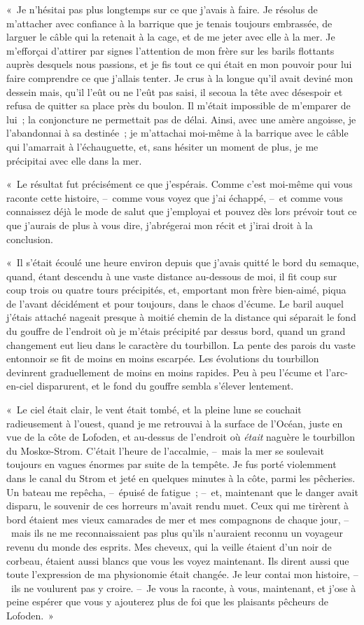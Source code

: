 \documentclass[french,twoside]{book} %
\begin{document}
« Je n’hésitai pas plus longtemps sur ce que j’avais à faire. Je résolus de m’attacher avec confiance à la barrique que je tenais toujours embrassée, de larguer le câble qui la retenait à la cage, et de me jeter avec elle à la mer. Je m’efforçai d’attirer par signes l’attention de mon frère sur les barils flottants auprès desquels nous passions, et je fis tout ce qui était en mon pouvoir pour lui faire comprendre ce que j’allais tenter. Je crus à la longue qu’il avait deviné mon dessein mais, qu’il l’eût ou ne l’eût pas saisi, il secoua la tête avec désespoir et refusa de quitter sa place près du boulon. Il m’était impossible de m’emparer de lui ; la conjoncture ne permettait pas de délai. Ainsi, avec une amère angoisse, je l’abandonnai à sa destinée ; je m’attachai moi-même à la barrique avec le câble qui l’amarrait à l’échauguette, et, sans hésiter un moment de plus, je me précipitai avec elle dans la mer.\par
« Le résultat fut précisément ce que j’espérais. Comme c’est moi-même qui vous raconte cette histoire, – comme vous voyez que j’ai échappé, – et comme vous connaissez déjà le mode de salut que j’employai et pouvez dès lors prévoir tout ce que j’aurais de plus à vous dire, j’abrégerai mon récit et j’irai droit à la conclusion.\par
« Il s’était écoulé une heure environ depuis que j’avais quitté le bord du semaque, quand, étant descendu à une vaste distance au-dessous de moi, il fit coup sur coup trois ou quatre tours précipités, et, emportant mon frère bien-aimé, piqua de l’avant décidément et pour toujours, dans le chaos d’écume. Le baril auquel j’étais attaché nageait presque à moitié chemin de la distance qui séparait le fond du gouffre de l’endroit où je m’étais précipité par dessus bord, quand un grand changement eut lieu dans le caractère du tourbillon. La pente des parois du vaste entonnoir se fit de moins en moins escarpée. Les évolutions du tourbillon devinrent graduellement de moins en moins rapides. Peu à peu l’écume et l’arc-en-ciel disparurent, et le fond du gouffre sembla s’élever lentement.\par
« Le ciel était clair, le vent était tombé, et la pleine lune se couchait radieusement à l’ouest, quand je me retrouvai à la surface de l’Océan, juste en vue de la côte de Lofoden, et au-dessus de l’endroit où \emph{était} naguère le tourbillon du Moskœ-Strom. C’était l’heure de l’accalmie, – mais la mer se soulevait toujours en vagues énormes par suite de la tempête. Je fus porté violemment dans le canal du Strom et jeté en quelques minutes à la côte, parmi les pêcheries. Un bateau me repêcha, – épuisé de fatigue ; – et, maintenant que le danger avait disparu, le souvenir de ces horreurs m’avait rendu muet. Ceux qui me tirèrent à bord étaient mes vieux camarades de mer et mes compagnons de chaque jour, – mais ils ne me reconnaissaient pas plus qu’ils n’auraient reconnu un voyageur revenu du monde des esprits. Mes cheveux, qui la veille étaient d’un noir de corbeau, étaient aussi blancs que vous les voyez maintenant. Ils dirent aussi que toute l’expression de ma physionomie était changée. Je leur contai mon histoire, – ils ne voulurent pas y croire. – Je vous la raconte, à vous, maintenant, et j’ose à peine espérer que vous y ajouterez plus de foi que les plaisants pêcheurs de Lofoden. »
\end{document}
